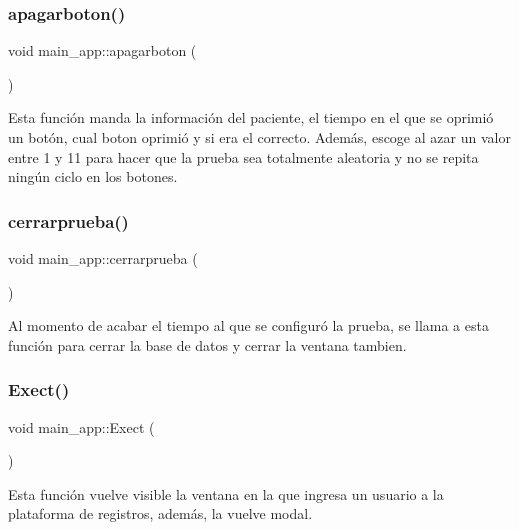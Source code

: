\subsubsection{\texorpdfstring{apagarboton()}{apagarboton()}}
{\footnotesize\ttfamily void main\+\_\+app\+::apagarboton (\begin{DoxyParamCaption}{ }\end{DoxyParamCaption})}

Esta función manda la información del paciente, el tiempo en el que se oprimió un botón, cual boton oprimió y si era el correcto. Además, escoge al azar un valor entre 1 y 11 para hacer que la prueba sea totalmente aleatoria y no se repita ningún ciclo en los botones. \mbox{\label{classmain__app_a2b53dcbe6d60dc8fd978924037ce88cb}} 
\subsubsection{\texorpdfstring{cerrarprueba()}{cerrarprueba()}}
{\footnotesize\ttfamily void main\+\_\+app\+::cerrarprueba (\begin{DoxyParamCaption}{ }\end{DoxyParamCaption})}

Al momento de acabar el tiempo al que se configuró la prueba, se llama a esta función para cerrar la base de datos y cerrar la ventana tambien. \mbox{\label{classmain__app_ab7becb80b6053dda9ca04f5ebe774ca0}} 
\subsubsection{\texorpdfstring{Exect()}{Exect()}}
{\footnotesize\ttfamily void main\+\_\+app\+::\+Exect (\begin{DoxyParamCaption}{ }\end{DoxyParamCaption})}

Esta función vuelve visible la ventana en la que ingresa un usuario a la plataforma de registros, además, la vuelve modal. \mbox{\label{classmain__app_a80f7a386d67024facffb6d1ae66c34d6}} 
